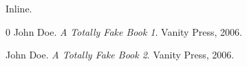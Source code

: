 
\def\mytitle{Inline Citations}


Inline. ~\citep{johndoe.atotallyfakebook1.vanitypress2006.}
~\citep{johndoe.atotallyfakebook2.vanitypress2006.}

\begin{thebibliography}{0}
John Doe. \emph{A Totally Fake Book 1}. Vanity Press, 2006.

John Doe. \emph{A Totally Fake Book 2}. Vanity Press, 2006.

\end{thebibliography}


